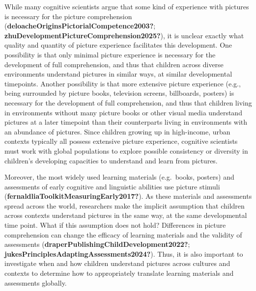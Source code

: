 \documentclass[10pt, letterpaper]{article}
\begin{document}
While many cognitive scientists argue that some kind of experience with
pictures is necessary for the picture comprehension
(\textbf{deloacheOriginsPictorialCompetence2003?};
\textbf{zhuDevelopmentPictureComprehension2025?}), it is unclear exactly
what quality and quantity of picture experience facilitates this
development. One possibility is that only minimal picture experience is
necessary for the development of full comprehension, and thus that
children across diverse environments understand pictures in similar
ways, at similar developmental timepoints. Another possibility is that
more extensive picture experience (e.g., being surrounded by picture
books, television screens, billboards, posters) is necessary for the
development of full comprehension, and thus that children living in
environments without many picture books or other visual media understand
pictures at a later timepoint than their counterparts living in
environments with an abundance of pictures. Since children growing up in
high-income, urban contexts typically all possess extensive picture
experience, cognitive scientists must work with global populations to
explore possible consistency or diversity in children's developing
capacities to understand and learn from pictures.

Moreover, the most widely used learning materials (e.g.~books, posters)
and assessments of early cognitive and linguistic abilities use picture
stimuli (\textbf{fernaldliaToolkitMeasuringEarly2017?}). As these
materials and assessments spread across the world, researchers make the
implicit assumption that children across contexts understand pictures in
the same way, at the same developmental time point. What if this
assumption does not hold? Differences in picture comprehension can
change the efficacy of learning materials and the validity of
assessments (\textbf{draperPublishingChildDevelopment2022?};
\textbf{jukesPrinciplesAdaptingAssessments2024?}). Thus, it is also
important to investigate when and how children understand pictures
across cultures and contexts to determine how to appropriately translate
learning materials and assessments globally.
\end{document}
